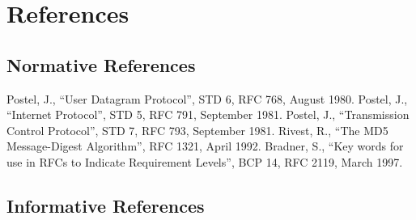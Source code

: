 \chapter{References}
\label{section-18}

\section{Normative References}

\begingroup
  \renewcommand{\chapter}[2]{}
  \begin{thebibliography}{}
     Postel, J., ``User Datagram Protocol'', STD 6, RFC 768, August 1980.
     Postel, J., ``Internet Protocol'', STD 5, RFC 791, September 1981.
     Postel, J., ``Transmission Control Protocol'', STD 7, RFC 793, September 1981.
     Rivest, R., ``The MD5 Message-Digest Algorithm'', RFC 1321, April 1992.
     Bradner, S., ``Key words for use in RFCs to Indicate Requirement Levels'', BCP 14, RFC 2119, March 1997.
  \end{thebibliography}
\endgroup

\section{Informative References}

